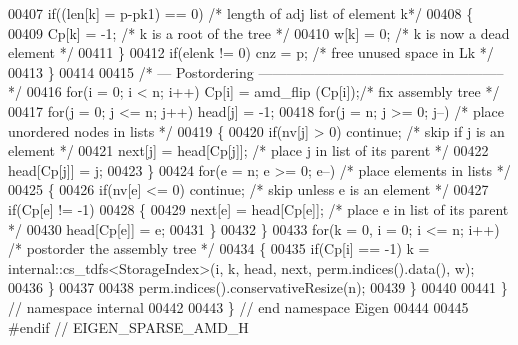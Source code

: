 \begin{DoxyCode}
00407     \textcolor{keywordflow}{if}((len[k] = p-pk1) == 0)         \textcolor{comment}{/* length of adj list of element k*/}
00408     \{
00409       Cp[k] = -1;                   \textcolor{comment}{/* k is a root of the tree */}
00410       w[k] = 0;                     \textcolor{comment}{/* k is now a dead element */}
00411     \}
00412     \textcolor{keywordflow}{if}(elenk != 0) cnz = p;           \textcolor{comment}{/* free unused space in Lk */}
00413   \}
00414   
00415   \textcolor{comment}{/* --- Postordering ----------------------------------------------------- */}
00416   \textcolor{keywordflow}{for}(i = 0; i < n; i++) Cp[i] = amd\_flip (Cp[i]);\textcolor{comment}{/* fix assembly tree */}
00417   \textcolor{keywordflow}{for}(j = 0; j <= n; j++) head[j] = -1;
00418   \textcolor{keywordflow}{for}(j = n; j >= 0; j--)              \textcolor{comment}{/* place unordered nodes in lists */}
00419   \{
00420     \textcolor{keywordflow}{if}(nv[j] > 0) \textcolor{keywordflow}{continue};          \textcolor{comment}{/* skip if j is an element */}
00421     next[j] = head[Cp[j]];          \textcolor{comment}{/* place j in list of its parent */}
00422     head[Cp[j]] = j;
00423   \}
00424   \textcolor{keywordflow}{for}(e = n; e >= 0; e--)              \textcolor{comment}{/* place elements in lists */}
00425   \{
00426     \textcolor{keywordflow}{if}(nv[e] <= 0) \textcolor{keywordflow}{continue};         \textcolor{comment}{/* skip unless e is an element */}
00427     \textcolor{keywordflow}{if}(Cp[e] != -1)
00428     \{
00429       next[e] = head[Cp[e]];      \textcolor{comment}{/* place e in list of its parent */}
00430       head[Cp[e]] = e;
00431     \}
00432   \}
00433   \textcolor{keywordflow}{for}(k = 0, i = 0; i <= n; i++)       \textcolor{comment}{/* postorder the assembly tree */}
00434   \{
00435     \textcolor{keywordflow}{if}(Cp[i] == -1) k = internal::cs\_tdfs<StorageIndex>(i, k, head, next, perm.indices().data(), w);
00436   \}
00437   
00438   perm.indices().conservativeResize(n);
00439 \}
00440 
00441 \} \textcolor{comment}{// namespace internal}
00442 
00443 \} \textcolor{comment}{// end namespace Eigen}
00444 
00445 \textcolor{preprocessor}{#endif // EIGEN\_SPARSE\_AMD\_H}
\end{DoxyCode}
